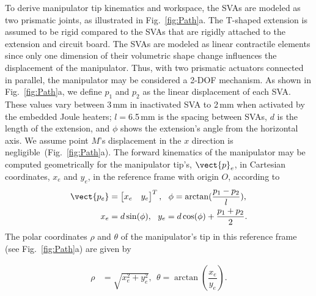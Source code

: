 To derive manipulator tip kinematics and  workspace, the SVAs are modeled as two prismatic joints, as illustrated in Fig.~\ref{fig:Path}a. The T-shaped extension is assumed to be rigid compared to the SVAs that are rigidly attached to the extension and circuit board. The SVAs are modeled as linear contractile elements since only one dimension of their volumetric shape change influences the displacement of the manipulator. Thus, with two prismatic actuators connected in parallel, the manipulator may be considered a 2-DOF mechanism. As shown in Fig.~\ref{fig:Path}a, we define $p_1$ and $p_2$ as the linear displacement of each SVA. These values vary between 3\,mm in inactivated SVA to 2\,mm when activated by the embedded Joule heaters;
$l=$6.5\,mm is the spacing between SVAs, $d$ is the length of the extension, and $\phi$ shows the extension's angle from the horizontal axis. We assume point $M$'s displacement in the $x$ direction is negligible~(Fig.~\ref{fig:Path}a).  The forward kinematics of the manipulator may be computed geometrically for the manipulator tip's, $\vect{p}_e$, in Cartesian coordinates, $x_e$ and $y_e$, in the reference frame with origin $O$, according to
\begin{align}
\vect{p_e}  &= \begin{bmatrix}x_e & y_e\end{bmatrix}^T,~~\phi = \arctan(\dfrac{p_1-p_2}{l}),\\
x_e &= d \sin(\phi),~~y_e= d \cos(\phi) + \dfrac{p_1+p_2}{2}.
\end{align}
The polar coordinates $\rho$ and $\theta$ of the manipulator's tip in this reference frame (see Fig.~\ref{fig:Path}a) are given by  

\begin{align}
\rho &=  \sqrt{x_e^2 + y_e^2},~~\theta = \arctan \left(\dfrac{x_e}{y_e}\right).
\end{align}
 
